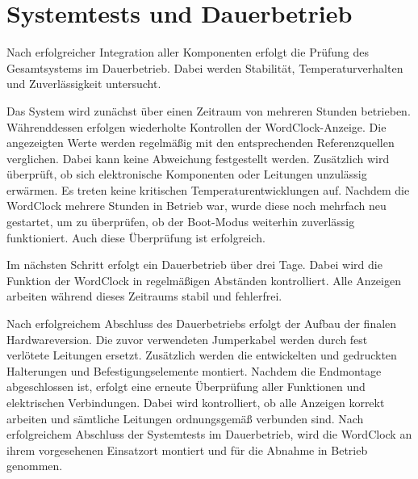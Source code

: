 \section{Systemtests und Dauerbetrieb}
Nach erfolgreicher Integration aller Komponenten erfolgt die Prüfung des Gesamtsystems im Dauerbetrieb.  
Dabei werden Stabilität, Temperaturverhalten und Zuverlässigkeit untersucht.  

Das System wird zunächst über einen Zeitraum von mehreren Stunden betrieben.  
Währenddessen erfolgen wiederholte Kontrollen der WordClock-Anzeige.  
Die angezeigten Werte werden regelmäßig mit den entsprechenden Referenzquellen verglichen.  
Dabei kann keine Abweichung festgestellt werden.  
Zusätzlich wird überprüft, ob sich elektronische Komponenten oder Leitungen unzulässig erwärmen.  
Es treten keine kritischen Temperaturentwicklungen auf.  
Nachdem die WordClock mehrere Stunden in Betrieb war, wurde diese noch mehrfach neu gestartet, um zu überprüfen, ob der Boot-Modus weiterhin zuverlässig funktioniert.  
Auch diese Überprüfung ist erfolgreich.  

Im nächsten Schritt erfolgt ein Dauerbetrieb über drei Tage.  
Dabei wird die Funktion der WordClock in regelmäßigen Abständen kontrolliert.  
Alle Anzeigen arbeiten während dieses Zeitraums stabil und fehlerfrei.  

Nach erfolgreichem Abschluss des Dauerbetriebs erfolgt der Aufbau der finalen Hardwareversion.  
Die zuvor verwendeten Jumperkabel werden durch fest verlötete Leitungen ersetzt.  
Zusätzlich werden die entwickelten und gedruckten Halterungen und Befestigungselemente montiert.  
Nachdem die Endmontage abgeschlossen ist, erfolgt eine erneute Überprüfung aller Funktionen und elektrischen Verbindungen.  
Dabei wird kontrolliert, ob alle Anzeigen korrekt arbeiten und sämtliche Leitungen ordnungsgemäß verbunden sind.  
Nach erfolgreichem Abschluss der Systemtests im Dauerbetrieb, wird die WordClock an ihrem vorgesehenen Einsatzort montiert und für die Abnahme in Betrieb genommen.